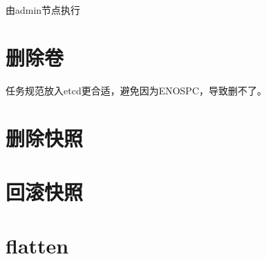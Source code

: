 由admin节点执行

\section{删除卷}

任务规范放入etcd更合适，避免因为ENOSPC，导致删不了。

\section{删除快照}

\section{回滚快照}

\section{flatten}




